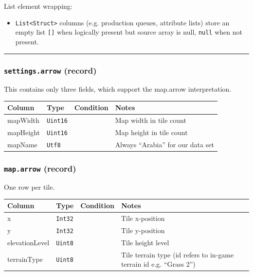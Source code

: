 List element wrapping:

\begin{itemize}
  \item \texttt{List<Struct>} columns (e.g. production queues, attribute lists) store an empty list \texttt{[]} when logically present but source array is null, \texttt{null} when not present.
\end{itemize}

\par\noindent\rule{\textwidth}{0.4pt}

\subsubsection*{\texttt{settings.arrow} (record)}

This contains only three fields, which support the map.arrow interpretation.
\begin{longtable}{@{}p{}p{}p{}p{}@{}}
  \toprule
  Column & Type & Condition & Notes \\
  \midrule
  \endhead
  mapWidth & \texttt{Uint16} & & Map width in tile count \\
  mapHeight & \texttt{Uint16} & & Map height in tile count \\
  mapName & \texttt{Utf8} & & Always ``Arabia'' for our data set \\
  \bottomrule
\end{longtable}

\subsubsection*{\texttt{map.arrow} (record)}

One row per tile.

\begin{longtable}{@{}p{}p{}p{}p{}@{}}
  \toprule
  Column & Type & Condition & Notes \\
  \midrule
  \endhead
  x & \texttt{Int32} & & Tile x-position \\
  y & \texttt{Int32} & & Tile y-position \\
  elevationLevel & \texttt{Uint8} & & Tile height level \\
  terrainType & \texttt{Uint8} & & Tile terrain type (id refers to in-game terrain id e.g. ``Grass 2'') \\
  \bottomrule
\end{longtable}

